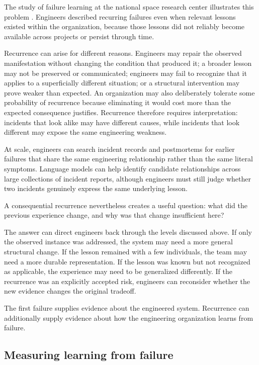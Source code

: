 The study of failure learning at the national space research center illustrates this problem
\citep{anandayuvaraj2026failures}. Engineers described recurring failures even when relevant lessons
existed within the organization, because those lessons did not reliably become available across
projects or persist through time.

Recurrence can arise for different reasons. Engineers may repair the observed manifestation
without changing the condition that produced it; a broader lesson may not be preserved or
communicated; engineers may fail to recognize that it applies to a superficially different
situation; or a structural intervention may prove weaker than expected. An organization may also
deliberately tolerate some probability of recurrence because eliminating it would cost more than
the expected consequence justifies. Recurrence therefore requires interpretation: incidents that
look alike may have different causes, while incidents that look different may expose the same
engineering weakness.

At scale, engineers can search incident records and postmortems for earlier failures that share the
same engineering relationship rather than the same literal symptoms. Language models can help
identify candidate relationships across large collections of incident reports, although engineers
must still judge whether two incidents genuinely express the same underlying lesson.

A consequential recurrence nevertheless creates a useful question: what did the previous experience
change, and why was that change insufficient here?

The answer can direct engineers back through the levels discussed above. If only the observed
instance was addressed, the system may need a more general structural change. If the lesson
remained with a few individuals, the team may need a more durable representation. If the lesson was
known but not recognized as applicable, the experience may need to be generalized differently. If
the recurrence was an explicitly accepted risk, engineers can reconsider whether the new evidence
changes the original tradeoff.

The first failure supplies evidence about the engineered system. Recurrence can additionally supply
evidence about how the engineering organization learns from failure.

\subsection{Measuring learning from failure}\label{sec-measuring-learning}

